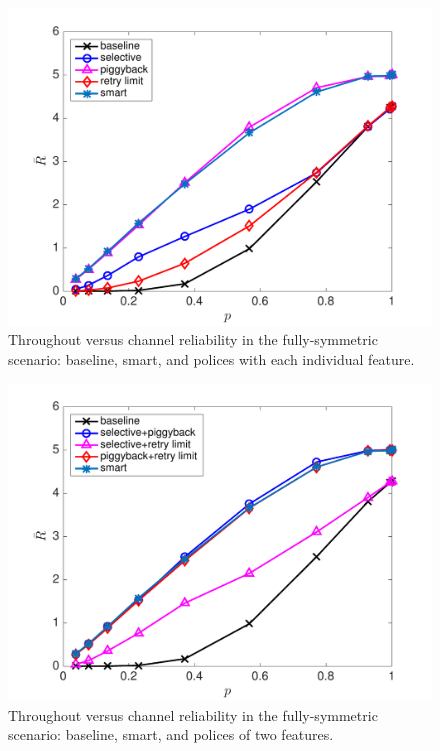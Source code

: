 \documentclass{article}
\begin{document}
\begin{figure}[htbp]
\centering
\includegraphics[scale=0.5]{3policycompare_sym.pdf}
\caption{Throughout versus channel reliability in the fully-symmetric scenario: baseline, smart, and polices with each individual feature.}
\label{sim: sym: three features}
\end{figure}
\begin{figure}[htbp]
\centering
\includegraphics[scale=0.5]{sym_threecombinepolicys.pdf}
\caption{Throughout versus channel reliability in the fully-symmetric scenario: baseline, smart, and polices of two features.}
\label{sim: sym: combined}
\end{figure}
\end{document}
